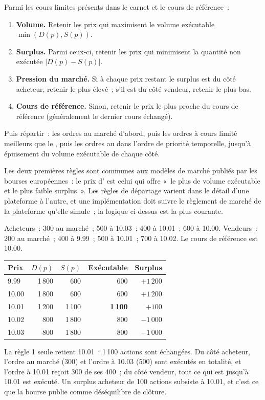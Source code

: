 \begin{method}\label{met:m1:auctions:rules}
Parmi les cours limites présents dans le carnet et le cours de référence~:
\begin{enumerate}
\item \textbf{Volume.} Retenir les prix qui maximisent le volume exécutable
  $\min(D(p),S(p))$.
\item \textbf{Surplus.} Parmi ceux-ci, retenir les prix qui minimisent la quantité non exécutée
  $|D(p) - S(p)|$.
\item \textbf{Pression du marché.} Si à chaque prix restant le surplus est du côté acheteur,
  retenir le plus élevé~; s'il est du côté vendeur, retenir le plus bas.
\item \textbf{Cours de référence.} Sinon, retenir le prix le plus proche du cours de référence
  (généralement le dernier cours échangé).
\end{enumerate}
Puis répartir~: les ordres au marché d'abord, puis les ordres à cours limité
meilleurs que le , puis les ordres au  dans l'ordre de priorité
temporelle, jusqu'à épuisement du volume exécutable de chaque côté.
\end{method}

Les deux premières règles sont communes aux modèles de marché publiés par les bourses
européennes~: le prix d' est celui qui offre «~le plus de volume exécutable et le plus faible
surplus~». Les règles de départage varient dans le détail d'une plateforme à l'autre, et une
implémentation doit suivre le règlement de marché de la plateforme qu'elle simule~; la logique ci-dessus
est la plus courante.

\begin{example}\label{ex:m1:auctions:eight}
Acheteurs~: 300 au marché~; 500 à 10.03~; 400 à 10.01~; 600 à 10.00. Vendeurs~: 200
au marché~; 400 à 9.99~; 500 à 10.01~; 700 à 10.02. Le cours de référence est
10.00.
\begin{center}\small
\begin{tabular}{@{}lrrrr@{}}
\hline
Prix & $D(p)$ & $S(p)$ & Exécutable & Surplus \\
\hline
9.99 & 1\,800 & 600 & 600 & $+1\,200$ \\
10.00 & 1\,800 & 600 & 600 & $+1\,200$ \\
10.01 & 1\,200 & 1\,100 & \textbf{1\,100} & $+100$ \\
10.02 & 800 & 1\,800 & 800 & $-1\,000$ \\
10.03 & 800 & 1\,800 & 800 & $-1\,000$ \\
\hline
\end{tabular}
\end{center}
La règle 1 seule retient 10.01~: 1\,100 actions sont échangées. Du côté acheteur, l'ordre au marché
(300) et l'ordre à 10.03 (500) sont exécutés en totalité, et l'ordre à 10.01 reçoit 300 de ses 400~;
du côté vendeur, tout ce qui est jusqu'à 10.01 est exécuté.
Un surplus acheteur de 100 actions subsiste à 10.01, et c'est ce que la bourse publie
comme déséquilibre de clôture.
\end{example}

